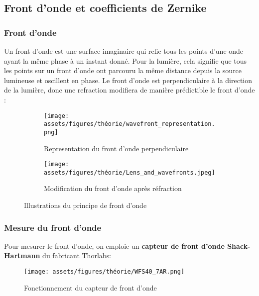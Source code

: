 
\newpage
\subsection{Front d'onde et coefficients de Zernike}
\subsubsection{Front d'onde}
Un front d’onde est une surface imaginaire qui relie tous les points d’une onde ayant la même phase à un instant donné.
Pour la lumière, cela signifie que tous les points sur un front d’onde ont parcouru la même distance depuis la source lumineuse et oscillent en phase.
Le front d'onde est perpendiculaire à la direction de la lumière, donc une refraction modifiera de manière prédictible le front d'onde :

\begin{figure}[H]
  \centering
  \begin{subfigure}{.5\textwidth}
    \centering
    \texttt{[image: assets/figures/théorie/wavefront\_representation.png]}
    \caption{Representation du front d'onde perpendiculaire}
    \label{fig:front_onde_perp}
  \end{subfigure}%
  \begin{subfigure}{.5\textwidth}
    \centering
    \texttt{[image: assets/figures/théorie/Lens\_and\_wavefronts.jpeg]}
    \caption{Modification du front d'onde après réfraction}
    \label{fig:refraction_front_onde}
  \end{subfigure}
  \caption[Illustration front d'onde]{Illustrations du principe de front d'onde \cite{wavefront_wikipedia}\footnotemark}
  \label{fig:illu_front_onde}
\end{figure}

\subsubsection{Mesure du front d'onde}

Pour mesurer le front d'onde, on emploie un \textbf{capteur de front d'onde Shack-Hartmann} du fabricant Thorlabs:

\begin{figure}[H]
  \centering
  \texttt{[image: assets/figures/théorie/WFS40\_7AR.png]}
  \caption[Fonctionnement WFS Thorlabs]{Fonctionnement du capteur de front d'onde\cite{WFS_thorlabs_site}\footnotemark}
  \label{fig:WFS_thorlabs_fonctionnement}
\end{figure}


